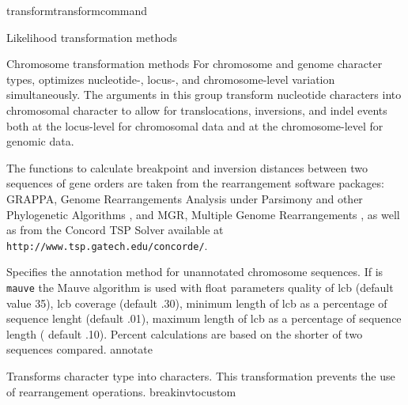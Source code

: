 \begin{command}{transform}{transformcommand}
\begin{arguments}
\begin{argumentgroup}{Likelihood transformation methods}
        \end{argumentgroup}


        \begin{argumentgroup}{Chromosome transformation methods}
            For chromosome and genome character types, \poy optimizes nucleotide-, 
            locus-, and chromosome-level variation simultaneously. The arguments in this group
            transform nucleotide characters into chromosomal character
            to allow for translocations, inversions, and indel events both at the locus-level for chromosomal data
            and at the chromosome-level for genomic data.
           
            The functions to calculate breakpoint and inversion distances between
            two sequences of gene orders are taken from the rearrangement software
            packages: GRAPPA, Genome Rearrangements Analysis under Parsimony and
            other Phylogenetic Algorithms \cite{baderetal2002}, and MGR, Multiple
            Genome Rearrangements \cite{bourqueandpevzner2002}, as well as from
            the Concord TSP Solver available at \texttt{http://www.tsp.gatech.edu/concorde/}.

                {Specifies the annotation method for unannotated chromosome sequences.
                If \poylident is \texttt{mauve} the Mauve algorithm is used \cite{darlingetal2004} with
                float parameters quality of lcb (default value 35), lcb coverage (default .30), 
                minimum length of lcb as a percentage of sequence lenght (default .01), maximum length of lcb as a percentage of 
                sequence length ( default .10).  Percent calculations are based on the shorter of two sequences compared.}
                {annotate}
                        
                {Transforms  character type into  characters.
                This transformation prevents the use of rearrangement operations.} 
                {breakinvtocustom}


\end{argumentgroup}
\end{arguments}
\end{command}
